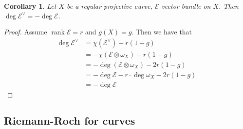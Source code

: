 \documentclass{ctexart}
\newtheorem{corollary}{Corollary}[section]
\newcommand{\rank}{\operatorname{rank}}
\begin{document}
\begin{corollary}
    Let $X$ be a regular projective curve, $\mathcal{E}$ vector bundle on $X$.
    Then $\deg \mathcal{E}^{\vee} = -\deg \mathcal{E}$.
    \label{Corollary 3.7}
\end{corollary}
\begin{proof}
    Assume $\rank \mathcal{E} = r$ and $g(X) = g$.
    Then we have that
    \begin{equation}
        \begin{split}
            \deg \mathcal{E}^{\vee} & = \chi(\mathcal{E}^{\vee}) - r(1 - g) \\
            & = -\chi(\mathcal{E} \otimes \omega_{X}) - r(1 - g) \\
            & = -\deg (\mathcal{E} \otimes \omega_{X}) - 2r(1 - g) \\
            & = -\deg \mathcal{E} - r \cdot \deg \omega_{X} - 2r(1 - g) \\
            & = -\deg \mathcal{E} 
        \end{split}
    \end{equation}
\end{proof}

\subsection{Riemann-Roch for curves}
\label{subsection:Riemann-Roch_Formula_Riemann-Roch_for_curves}
\end{document}
